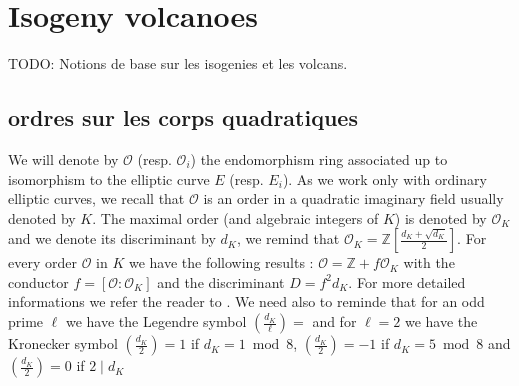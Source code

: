 \documentclass{lms}
\newcommand{\todo}[1]{{\color{red}TODO: #1}}
\begin{document}

\section{Isogeny volcanoes}
\label{sec:isogeny-volcanoes}

\todo{Notions de base sur les isogenies et les volcans.}

\subsection{ordres sur les corps quadratiques}%
We will denote by $\mathcal{O}$ (resp. $\mathcal{O}_i$) the endomorphism ring associated up to isomorphism to the elliptic curve $E$ (resp. $E_i$). As we work only with ordinary elliptic curves, we recall that $\mathcal{O}$ is an order in a quadratic imaginary field usually denoted by $K$. The maximal order (and algebraic integers of $K$) is denoted by $\mathcal{O}_K$ and we denote its discriminant by $d_K$, we remind that $\mathcal{O}_K=\mathbb{Z}[\frac{d_K+\sqrt{d_K}}{2}]$. For every order $\mathcal{O}$ in $K$ we have the following results : $\mathcal{O}= \mathbb{Z}+ f \mathcal{O}_K$ with the conductor $f=[\mathcal{O}:\mathcal{O}_K]$ and the discriminant $D=f^2d_K$. For more detailed informations we refer the reader to \cite{Cox89}. We need also to reminde that for an odd prime $\ell$ we have the Legendre symbol $\left( \frac{d_K}{\ell} \right)=$ and for $\ell=2$ we have the Kronecker symbol $\left( \frac{d_K}{2} \right)= 1$ if $d_K = 1 \bmod 8$, $\left( \frac{d_K}{2} \right)= -1$ if $d_K = 5 \bmod 8$ and $\left( \frac{d_K}{2} \right)= 0$ if $2 \mid d_K$ %
\end{document}
